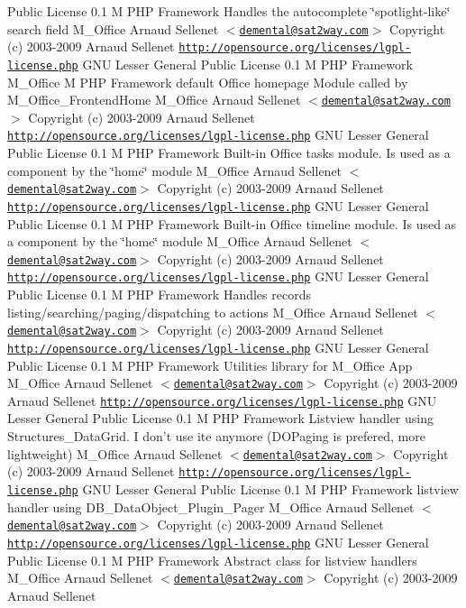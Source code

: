 \begin{Desc}
Public License  0.1  M PHP Framework  Handles the autocomplete \char`\"{}spotlight-like\char`\"{} search field   M\_\-Office  Arnaud Sellenet $<$\href{mailto:demental@sat2way.com}{\tt demental@sat2way.com}$>$  Copyright (c) 2003-2009 Arnaud Sellenet  \href{http://opensource.org/licenses/lgpl-license.php}{\tt http://opensource.org/licenses/lgpl-license.php} GNU Lesser General Public License  0.1  M PHP Framework   M\_\-Office  M PHP Framework  default Office homepage Module called by M\_\-Office\_\-FrontendHome   M\_\-Office  Arnaud Sellenet $<$\href{mailto:demental@sat2way.com}{\tt demental@sat2way.com}$>$  Copyright (c) 2003-2009 Arnaud Sellenet  \href{http://opensource.org/licenses/lgpl-license.php}{\tt http://opensource.org/licenses/lgpl-license.php} GNU Lesser General Public License  0.1  M PHP Framework  Built-in Office tasks module. Is used as a component by the \char`\"{}home\char`\"{} module   M\_\-Office  Arnaud Sellenet $<$\href{mailto:demental@sat2way.com}{\tt demental@sat2way.com}$>$  Copyright (c) 2003-2009 Arnaud Sellenet  \href{http://opensource.org/licenses/lgpl-license.php}{\tt http://opensource.org/licenses/lgpl-license.php} GNU Lesser General Public License  0.1  M PHP Framework  Built-in Office timeline module. Is used as a component by the \char`\"{}home\char`\"{} module   M\_\-Office  Arnaud Sellenet $<$\href{mailto:demental@sat2way.com}{\tt demental@sat2way.com}$>$  Copyright (c) 2003-2009 Arnaud Sellenet  \href{http://opensource.org/licenses/lgpl-license.php}{\tt http://opensource.org/licenses/lgpl-license.php} GNU Lesser General Public License  0.1  M PHP Framework  Handles records listing/searching/paging/dispatching to actions   M\_\-Office  Arnaud Sellenet $<$\href{mailto:demental@sat2way.com}{\tt demental@sat2way.com}$>$  Copyright (c) 2003-2009 Arnaud Sellenet  \href{http://opensource.org/licenses/lgpl-license.php}{\tt http://opensource.org/licenses/lgpl-license.php} GNU Lesser General Public License  0.1  M PHP Framework  Utilities library for M\_\-Office App   M\_\-Office  Arnaud Sellenet $<$\href{mailto:demental@sat2way.com}{\tt demental@sat2way.com}$>$  Copyright (c) 2003-2009 Arnaud Sellenet  \href{http://opensource.org/licenses/lgpl-license.php}{\tt http://opensource.org/licenses/lgpl-license.php} GNU Lesser General Public License  0.1  M PHP Framework  Listview handler using Structures\_\-DataGrid. I don't use ite anymore (DOPaging is prefered, more lightweight)   M\_\-Office  Arnaud Sellenet $<$\href{mailto:demental@sat2way.com}{\tt demental@sat2way.com}$>$  Copyright (c) 2003-2009 Arnaud Sellenet  \href{http://opensource.org/licenses/lgpl-license.php}{\tt http://opensource.org/licenses/lgpl-license.php} GNU Lesser General Public License  0.1  M PHP Framework  listview handler using DB\_\-DataObject\_\-Plugin\_\-Pager   M\_\-Office  Arnaud Sellenet $<$\href{mailto:demental@sat2way.com}{\tt demental@sat2way.com}$>$  Copyright (c) 2003-2009 Arnaud Sellenet  \href{http://opensource.org/licenses/lgpl-license.php}{\tt http://opensource.org/licenses/lgpl-license.php} GNU Lesser General Public License  0.1  M PHP Framework  Abstract class for listview handlers   M\_\-Office  Arnaud Sellenet $<$\href{mailto:demental@sat2way.com}{\tt demental@sat2way.com}$>$  Copyright (c) 2003-2009 Arnaud Sellenet  
\end{Desc}
